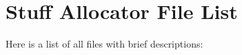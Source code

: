 \section{Stuff Allocator File List}
Here is a list of all files with brief descriptions:\begin{CompactList}
\item{}
\end{CompactList}
